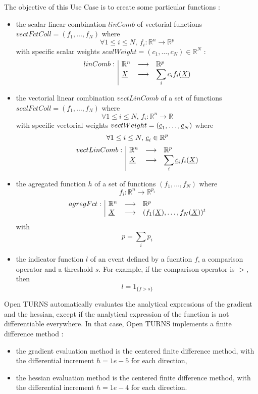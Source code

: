 The objective of this Use Case is to create some particular functions :
\begin{itemize}
\item the scalar linear combination $linComb$ of vectorial functions $vectFctColl = (f_1, \hdots, f_N)$ where 
  $$
   \forall 1 \leq i \leq N, \,     f_i : \mathbb{R}^n \longrightarrow \mathbb{R}^{p}
  $$
  with specific scalar weights $scalWeight = (c_1, \hdots, c_N)\in \mathbb{R}^N $ :
   $$
    \begin{array}{l|lcl}
    linComb : & \mathbb{R}^n & \longrightarrow & \mathbb{R}^{p} \\
              &  {\underline{X}} & \longrightarrow & \displaystyle \sum_i c_if_i ({\underline{X}})
    \end{array}
    $$


\item the vectorial linear combination $vectLinComb$ of a set of  functions $scalFctColl = (f_1, \hdots, f_N)$ where 
  $$
  \forall 1 \leq i \leq N, \,     f_i : \mathbb{R}^n \longrightarrow \mathbb{R}
  $$
  with specific vectorial weights $vectWeight = ({\underline{c}}_1, \hdots, {\underline{c}}_N)$  where 
    $$
    \forall 1 \leq i \leq N, \,   {\underline{c}}_i \in \mathbb{R}^p
    $$
   $$
    \begin{array}{l|lcl}
    vectLinComb : & \mathbb{R}^n & \longrightarrow & \mathbb{R}^{p} \\
              &  {\underline{X}} & \longrightarrow & \displaystyle \sum_i {\underline{c}}_if_i ({\underline{X}})
    \end{array}
    $$

\item the agregated function $h$ of a set of functions $(f_1, \hdots, f_N)$ where 
    $$
    f_i : \mathbb{R}^n \longrightarrow \mathbb{R}^{p_i}
    $$
   $$
    \begin{array}{l|lcl}
    agregFct : & \mathbb{R}^n & \longrightarrow & \mathbb{R}^{p} \\
              &  {\underline{X}} & \longrightarrow & (f_1({\underline{X}}), \hdots, f_N({\underline{X}}))^t
    \end{array}
    $$
    with
    $$
    p = \displaystyle \sum_i p_i
    $$

\item the indicator function $l$ of an event defined by a fucntion $f$, a comparison operator and a threshold $s$. For example, if the comparison operator is $>$, then
  $$
  l = 1_{\{f > s\}}
  $$
\end{itemize}


Open TURNS automatically evaluates the analytical expressions of the gradient and the hessian, except if the analytical expression of the function is not differentiable everywhere. In that case, Open TURNS implements a finite difference method :
\begin{itemize}
\item the gradient evaluation method is the centered finite difference method, with the differential increment $h=1e-5$ for each direction,
\item the hessian evaluation method is the centered finite difference method, with the differential increment $h=1e-4$ for each direction.
\end{itemize}

